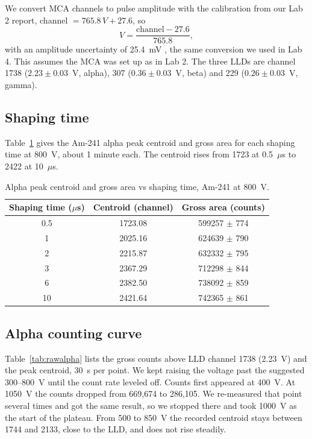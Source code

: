 \documentclass[12pt]{article}
\begin{document}
We convert MCA channels to pulse amplitude with the calibration from our Lab 2 report, channel $= 765.8\,V + 27.6$, so
\begin{equation}
V = \frac{\text{channel} - 27.6}{765.8},
\label{eq:mcacal}
\end{equation}
with an amplitude uncertainty of 25.4~mV \cite{lab2}, the same conversion we used in Lab 4. This assumes the MCA was set up as in Lab 2. The three LLDs are channel 1738 ($2.23 \pm 0.03$~V, alpha), 307 ($0.36 \pm 0.03$~V, beta) and 229 ($0.26 \pm 0.03$~V, gamma).

\subsection{Shaping time}

Table~\ref{tab:rawshape} gives the Am-241 alpha peak centroid and gross area for each shaping time at 800~V, about 1 minute each. The centroid rises from 1723 at 0.5~$\mu$s to 2422 at 10~$\mu$s.

\begin{table}[!htbp]
\centering\small
\begin{tabular}{ccc}
\toprule
\textbf{Shaping time ($\mu$s)} & \textbf{Centroid (channel)} & \textbf{Gross area (counts)} \\
\midrule
0.5 & 1723.08 & 599257 $\pm$ 774 \\
1 & 2025.16 & 624639 $\pm$ 790 \\
2 & 2215.87 & 632332 $\pm$ 795 \\
3 & 2367.29 & 712298 $\pm$ 844 \\
6 & 2382.50 & 738092 $\pm$ 859 \\
10 & 2421.64 & 742365 $\pm$ 861 \\
\bottomrule
\end{tabular}
\caption{Alpha peak centroid and gross area vs shaping time, Am-241 at 800~V.}
\label{tab:rawshape}
\end{table}

\subsection{Alpha counting curve}

Table~\ref{tab:rawalpha} lists the gross counts above LLD channel 1738 (2.23~V) and the peak centroid, 30~s per point. We kept raising the voltage past the suggested 300--800~V \cite{labmanual} until the count rate leveled off. Counts first appeared at 400~V. At 1050~V the counts dropped from 669,674 to 286,105. We re-measured that point several times and got the same result, so we stopped there and took 1000~V as the start of the plateau. From 500 to 850~V the recorded centroid stays between 1744 and 2133, close to the LLD, and does not rise steadily.
\end{document}
